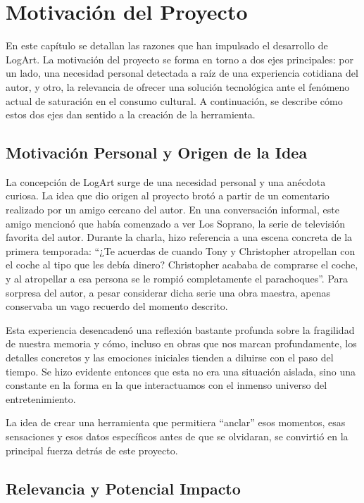 \section{Motivación del Proyecto}

En este capítulo se detallan las razones que han impulsado el desarrollo de LogArt. La motivación del proyecto se forma en torno a dos ejes principales: por un lado, una necesidad personal detectada a raíz de una experiencia cotidiana del autor, y otro, la relevancia de ofrecer una solución tecnológica ante el fenómeno actual de saturación en el consumo cultural. A continuación, se describe cómo estos dos ejes dan sentido a la creación de la herramienta.

\subsection{Motivación Personal y Origen de la Idea}

La concepción de LogArt surge de una necesidad personal y una anécdota curiosa. La idea que dio origen al proyecto brotó a partir de un comentario realizado por un amigo cercano del autor. En una conversación informal, este amigo mencionó que había comenzado a ver Los Soprano, la serie de televisión favorita del autor. Durante la charla, hizo referencia a una escena concreta de la primera temporada: ``¿Te acuerdas de cuando Tony y Christopher atropellan con el coche al tipo que les debía dinero? Christopher acababa de comprarse el coche, y al atropellar a esa persona se le rompió completamente el parachoques''. Para sorpresa del autor, a pesar considerar dicha serie una obra maestra, apenas conservaba un vago recuerdo del momento descrito.

Esta experiencia desencadenó una reflexión bastante profunda sobre la fragilidad de nuestra memoria y cómo, incluso en obras que nos marcan profundamente, los detalles concretos y las emociones iniciales tienden a diluirse con el paso del tiempo. Se hizo evidente entonces que esta no era una situación aislada, sino una constante en la forma en la que interactuamos con el inmenso universo del entretenimiento.

La idea de crear una herramienta que permitiera ``anclar'' esos momentos, esas sensaciones y esos datos específicos antes de que se olvidaran, se convirtió en la principal fuerza detrás de este proyecto.

\subsection{Relevancia y Potencial Impacto}

